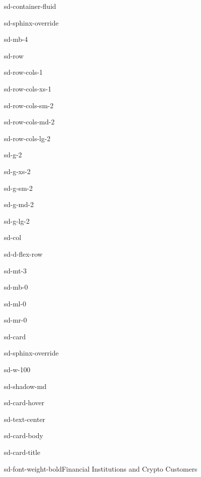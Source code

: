 \documentclass[letterpaper,10pt,english]{jupyterBook}
\begin{document}
\begin{sphinxuseclass}{sd-container-fluid}
\begin{sphinxuseclass}{sd-sphinx-override}
\begin{sphinxuseclass}{sd-mb-4}
\begin{sphinxuseclass}{sd-row}
\begin{sphinxuseclass}{sd-row-cols-1}
\begin{sphinxuseclass}{sd-row-cols-xs-1}
\begin{sphinxuseclass}{sd-row-cols-sm-2}
\begin{sphinxuseclass}{sd-row-cols-md-2}
\begin{sphinxuseclass}{sd-row-cols-lg-2}
\begin{sphinxuseclass}{sd-g-2}
\begin{sphinxuseclass}{sd-g-xs-2}
\begin{sphinxuseclass}{sd-g-sm-2}
\begin{sphinxuseclass}{sd-g-md-2}
\begin{sphinxuseclass}{sd-g-lg-2}
\begin{sphinxuseclass}{sd-col}
\begin{sphinxuseclass}{sd-d-flex-row}
\begin{sphinxuseclass}{sd-mt-3}
\begin{sphinxuseclass}{sd-mb-0}
\begin{sphinxuseclass}{sd-ml-0}
\begin{sphinxuseclass}{sd-mr-0}
\begin{sphinxuseclass}{sd-card}
\begin{sphinxuseclass}{sd-sphinx-override}
\begin{sphinxuseclass}{sd-w-100}
\begin{sphinxuseclass}{sd-shadow-md}
\begin{sphinxuseclass}{sd-card-hover}
\begin{sphinxuseclass}{sd-text-center}
\begin{sphinxuseclass}{sd-card-body}
\begin{sphinxuseclass}{sd-card-title}
\begin{sphinxuseclass}{sd-font-weight-bold}Financial Institutions and Crypto Customers
\end{sphinxuseclass}
\end{sphinxuseclass}





\end{sphinxuseclass}
\end{sphinxuseclass}
\end{sphinxuseclass}
\end{sphinxuseclass}
\end{sphinxuseclass}
\end{sphinxuseclass}
\end{sphinxuseclass}
\end{sphinxuseclass}
\end{sphinxuseclass}
\end{sphinxuseclass}
\end{sphinxuseclass}
\end{sphinxuseclass}
\end{sphinxuseclass}
\end{sphinxuseclass}
\end{sphinxuseclass}
\end{sphinxuseclass}
\end{sphinxuseclass}
\end{sphinxuseclass}
\end{sphinxuseclass}
\end{sphinxuseclass}
\end{sphinxuseclass}
\end{sphinxuseclass}
\end{sphinxuseclass}
\end{sphinxuseclass}
\end{sphinxuseclass}
\end{sphinxuseclass}
\end{sphinxuseclass}
\end{document}
